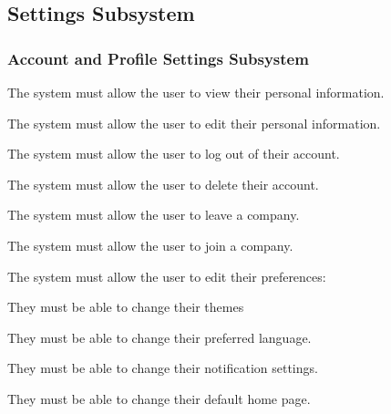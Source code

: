 \documentclass{article}
\begin{document}
	\subsection*{Settings Subsystem}	
	\subsubsection*{Account and Profile Settings Subsystem}	
	\begin{list}{R.}{}
		\item The system must allow the user to view their personal information. 
		\item The system must allow the user to edit their personal information.
		\item The system must allow the user to log out of their account.
		\item The system must allow the user to delete their account.
		\item The system must allow the user to leave a company.
		\item The system must allow the user to join a company.
		\item The system must allow the user to edit their preferences: 
		\begin{list}{R.}{}
			\item They must be able to change their themes
			\item They must be able to change their preferred language.
			\item They must be able to change their notification settings.
			\item They must be able to change their default home page.
		\end{list}
	\end{list}
\end{document}

